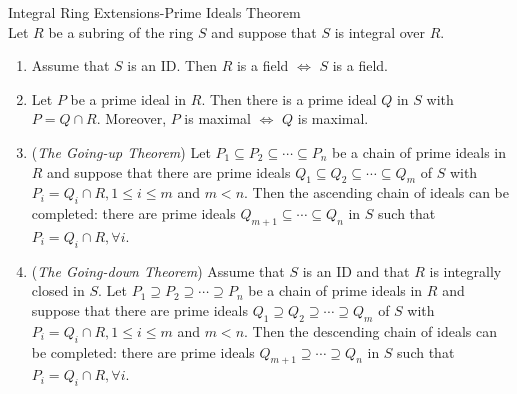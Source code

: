 \begin{theorem}{Integral Ring Extensions-Prime Ideals Theorem}\\
Let $R$ be a subring of the ring $S$ and suppose that $S$ is integral over $R$.
\begin{enumerate}
    \item Assume that $S$ is an ID. Then $R$ is a field $\Leftrightarrow$ $S$ is a field.
    \item Let $P$ be a prime ideal in $R$. Then there is a prime ideal $Q$ in $S$ with $P=Q \cap R$. Moreover, $P$ is maximal $\Leftrightarrow$ $Q$ is maximal.

    \item (\textit{The Going-up Theorem}) Let $P_1 \subseteq P_2 \subseteq \cdots \subseteq P_n$ be a chain of prime ideals in $R$ and suppose that there are prime ideals $Q_1 \subseteq Q_2 \subseteq \cdots \subseteq Q_m$ of $S$ with $P_i =Q_i \cap R,1\leq i \leq m$ and $m<n$. Then the ascending chain of ideals can be completed: there are prime ideals $Q_{m+1} \subseteq \cdots \subseteq Q_{n}$ in $S$ such that $P_i= Q_i \cap R,\forall i$.

    \item (\textit{The Going-down Theorem}) Assume that $S$ is an ID and that $R$ is integrally closed in $S$. Let $P_1 \supseteq P_2 \supseteq \cdots \supseteq P_n$ be a chain of prime ideals in $R$ and suppose that there are prime ideals $Q_1 \supseteq Q_2 \supseteq \cdots \supseteq Q_m$ of $S$ with $P_i =Q_i \cap R,1\leq i \leq m$ and $m<n$. Then the descending chain of ideals can be completed: there are prime ideals $Q_{m+1} \supseteq \cdots \supseteq Q_n$ in $S$ such that $P_i = Q_i \cap R,\forall i$.
\end{enumerate}
\end{theorem}

